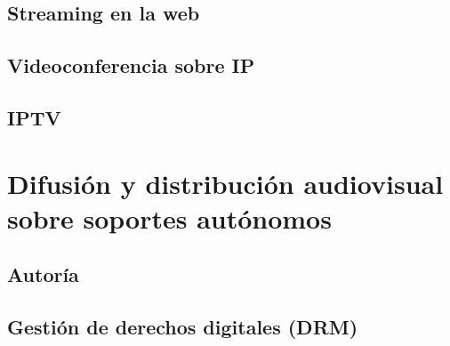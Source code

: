 \documentclass[10pt]{book}
\begin{document}
\section{Streaming en la web}
\section{Videoconferencia sobre IP}
\section{IPTV}

\chapter{Difusión y distribución audiovisual sobre soportes autónomos}
\section{Autoría}
\section{Gestión de derechos digitales (DRM)}
\end{document}
